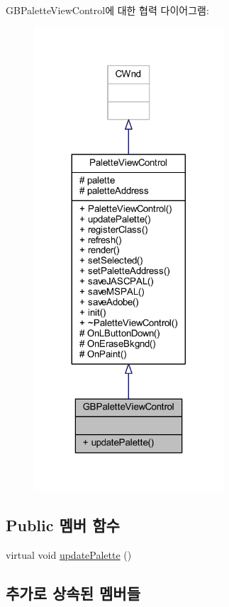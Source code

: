 G\+B\+Palette\+View\+Control에 대한 협력 다이어그램\+:\nopagebreak
\begin{figure}[H]
\begin{center}
\leavevmode
\includegraphics[width=200pt]{class_g_b_palette_view_control__coll__graph}
\end{center}
\end{figure}
\subsection*{Public 멤버 함수}
\begin{DoxyCompactItemize}
\item 
virtual void \mbox{\hyperlink{class_g_b_palette_view_control_a0fb70c16ea8f4731e7159df59beb3c6e}{update\+Palette}} ()
\end{DoxyCompactItemize}
\subsection*{추가로 상속된 멤버들}


